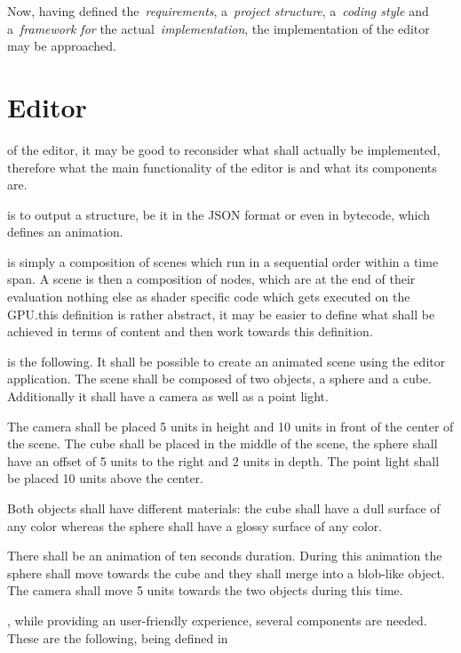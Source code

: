 \documentclass[%
    a4paper,    %
    justified,  %
    nobib,      %
    openany     %
]{tufte-book}
\makeatletter
\renewcommand{\label}[1]{\@tufte@label{##1}}%
\makeatother
\begin{document}
Now, having defined the~\emph{requirements}, a~\emph{project structure},
a~\emph{coding style} and a~\emph{framework for} the
actual~\emph{implementation}, the implementation of the editor may be
approached.

\chapter{Editor}
\label{appendix:chap:editor}

 of the editor, it may
be good to reconsider what shall actually be implemented, therefore what the
main functionality of the editor is and what its components are.

 is to output a structure, be it in
the JSON format or even in bytecode, which defines an animation.

 is simply a composition of scenes which run in a
sequential order within a time span. A scene is then a composition of nodes,
which are at the end of their evaluation nothing else as shader specific code
which gets executed on the GPU.\@As this definition is rather abstract, it may be
easier to define what shall be achieved in terms of content and then work
towards this definition.

 is the following.
It shall be possible to create an animated scene using the editor application.
The scene shall be composed of two objects, a sphere and a cube. Additionally it
shall have a camera as well as a point light.

The camera shall be placed 5 units in height and 10 units in front of the center
of the scene. The cube shall be placed in the middle of the scene, the sphere
shall have an offset of 5 units to the right and 2 units in depth. The point
light shall be placed 10 units above the center.

Both objects shall have different materials: the cube shall have a dull surface
of any color whereas the sphere shall have a glossy surface of any color.

There shall be an animation of ten seconds duration. During this animation the
sphere shall move towards the cube and they shall merge into a blob-like object.
The camera shall move 5 units towards the two objects during this time.

, while providing an user-friendly
experience, several components are needed. These are the following, being
defined in~~\cite{osterwalder-qde-2016}
\end{document}
